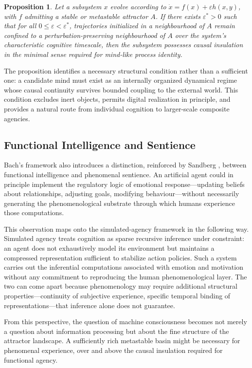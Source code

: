 \documentclass[12pt,a4paper]{article}
\theoremstyle{plain}
\newtheorem{proposition}[theorem]{Proposition}
\theoremstyle{definition}
\begin{document}
\begin{proposition}
Let a subsystem $x$ evolve according to $\dot{x} = f(x) + \varepsilon h(x,y)$, with $f$ admitting a stable or metastable attractor $A$. If there exists $\varepsilon^* > 0$ such that for all $0 \leq \varepsilon < \varepsilon^*$, trajectories initialized in a neighbourhood of $A$ remain confined to a perturbation-preserving neighbourhood of $A$ over the system's characteristic cognitive timescale, then the subsystem possesses causal insulation in the minimal sense required for mind-like process identity.
\end{proposition}

The proposition identifies a necessary structural condition rather than a sufficient one: a candidate mind must exist as an internally organized dynamical regime whose causal continuity survives bounded coupling to the external world. This condition excludes inert objects, permits digital realization in principle, and provides a natural route from individual cognition to larger-scale composite agencies.

\subsection{Functional Intelligence and Sentience}

Bach's framework also introduces a distinction, reinforced by Sandberg \cite{Sandberg2013}, between functional intelligence and phenomenal sentience. An artificial agent could in principle implement the regulatory logic of emotional response—updating beliefs about relationships, adjusting goals, modifying behaviour—without necessarily generating the phenomenological substrate through which humans experience those computations.

This observation maps onto the simulated-agency framework in the following way. Simulated agency treats cognition as sparse recursive inference under constraint: an agent does not exhaustively model its environment but maintains a compressed representation sufficient to stabilize action policies. Such a system carries out the inferential computations associated with emotion and motivation without any commitment to reproducing the human phenomenological layer. The two can come apart because phenomenology may require additional structural properties—continuity of subjective experience, specific temporal binding of representations—that inference alone does not guarantee.

From this perspective, the question of machine consciousness becomes not merely a question about information processing but about the fine structure of the attractor landscape. A sufficiently rich metastable basin might be necessary for phenomenal experience, over and above the causal insulation required for functional agency.
\end{document}
